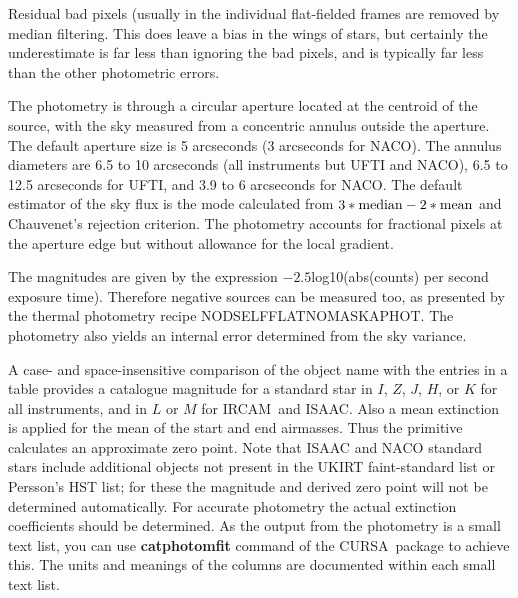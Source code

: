 \documentclass[twoside,11pt]{article}
\newcommand{\htmladdnormallink}[2]{#1}
\newcommand{\htmlref}[2]{#1}
\newcommand{\xref}[3]{#1}
\renewcommand{\_}{\texttt{\symbol{95}}}
\newcommand{\lsk}{\raisebox{-0.4ex}{\rm *}}
\newcommand{\CURSA}{{\footnotesize CURSA}}
\newcommand{\IRCAM}{\htmladdnormallink{IRCAM}{http://www.jach.hawaii.edu/JACpublic/UKIRT/instruments/ircam/ircam3.html}}
\newcommand{\ISAAC}{\htmladdnormallink{ISAAC}{http://www.eso.org/instruments/isaac/}}
\newcommand{\NACO}{\htmladdnormallink{NACO}{http://www.eso.org/instruments/naco/}}
\newcommand{\UFTI}{\htmladdnormallink{UFTI}{http://www.jach.hawaii.edu/JACpublic/UKIRT/instruments/ufti/ufti.html}}
\begin{document}
Residual bad pixels (usually in the individual flat-fielded frames
are removed by median filtering.  This does leave a bias in the wings
of stars, but certainly the underestimate is far less than ignoring
the bad pixels, and is typically far less than the other photometric
errors.

The photometry is through a circular aperture located at the centroid
of the source, with the sky measured from a concentric annulus outside
the aperture.  The default aperture size is 5 arcseconds (3 arcseconds
for NACO).  The annulus diameters are 6.5 to 10 arcseconds (all
instruments but UFTI and NACO), 6.5 to 12.5 arcseconds for \UFTI, and
3.9 to 6 arcseconds for \NACO.  The default estimator of the sky flux is
the mode calculated from $3*{\rm median}-2*{\rm mean}$ and Chauvenet's
rejection criterion.  The photometry accounts for fractional pixels at
the aperture edge but without allowance for the local gradient.

The magnitudes are given by the expression $-2.5 $\lsk$
$log10(abs(counts) per second exposure time).  Therefore negative
sources can be measured too, as presented by the thermal photometry
recipe \htmlref{NOD\_SELF\_FLAT\_NO\_MASK\_APHOT}{NOD\_SELF\_FLAT\_NO\_MASK\_APHOT}.
The photometry also yields an internal error determined from
the sky variance.

A case- and space-insensitive comparison of the object name with the
entries in a table provides a catalogue magnitude for a standard star
in $I$, $Z$, $J$, $H$, or $K$ for all instruments, and in $L$ or $M$
for \IRCAM\ and \ISAAC.  Also a mean extinction is applied for the
mean of the start and end airmasses.  Thus the primitive calculates an
approximate zero point.  Note that ISAAC and NACO standard stars
include additional objects not present in the \htmladdnormallink{UKIRT
faint-standard list}{http://www.jach.hawaii.edu/JACpublic/UKIRT/astronomy/calib/faint_stds.html}
or \htmladdnormallink{Persson's HST
list;}{http://www.ociw.edu/lco/dupont/instruments/manuals/ir/standards/hst.html}
for these the magnitude and derived zero point will not be determined
automatically.  For accurate photometry the actual extinction
coefficients should be determined. As the output from the photometry
is a \xref{small text list}{sun190}{STLREF}, you can use
\xref{{\bf catphotomfit} command}{sun190}{PHOTCAL} of the \CURSA\ package
to achieve this.  The units and meanings of the columns are documented
within each small text list.
\end{document}
